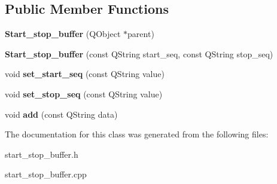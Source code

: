 \subsection*{Public Member Functions}
\begin{DoxyCompactItemize}
\item 
\hypertarget{class_log__viewer_1_1_start__stop__buffer_ae5cddbe89a87ad6c06f94e92b4dccb1d}{{\bfseries Start\-\_\-stop\-\_\-buffer} (Q\-Object $\ast$parent)}\label{class_log__viewer_1_1_start__stop__buffer_ae5cddbe89a87ad6c06f94e92b4dccb1d}

\item 
\hypertarget{class_log__viewer_1_1_start__stop__buffer_abdc4d0581880f1fbd39574a6edf4bcf1}{{\bfseries Start\-\_\-stop\-\_\-buffer} (const Q\-String start\-\_\-seq, const Q\-String stop\-\_\-seq)}\label{class_log__viewer_1_1_start__stop__buffer_abdc4d0581880f1fbd39574a6edf4bcf1}

\item 
\hypertarget{class_log__viewer_1_1_start__stop__buffer_aea7fdae2446221e5f425bd1db84c2648}{void {\bfseries set\-\_\-start\-\_\-seq} (const Q\-String value)}\label{class_log__viewer_1_1_start__stop__buffer_aea7fdae2446221e5f425bd1db84c2648}

\item 
\hypertarget{class_log__viewer_1_1_start__stop__buffer_a75a891ba2d32f61c80d778155a60079d}{void {\bfseries set\-\_\-stop\-\_\-seq} (const Q\-String value)}\label{class_log__viewer_1_1_start__stop__buffer_a75a891ba2d32f61c80d778155a60079d}

\item 
\hypertarget{class_log__viewer_1_1_start__stop__buffer_a34a6c39a3a78b7bbc56324d8a9f898f3}{void {\bfseries add} (const Q\-String data)}\label{class_log__viewer_1_1_start__stop__buffer_a34a6c39a3a78b7bbc56324d8a9f898f3}

\end{DoxyCompactItemize}


The documentation for this class was generated from the following files\-:\begin{DoxyCompactItemize}
\item 
start\-\_\-stop\-\_\-buffer.\-h\item 
start\-\_\-stop\-\_\-buffer.\-cpp\end{DoxyCompactItemize}
